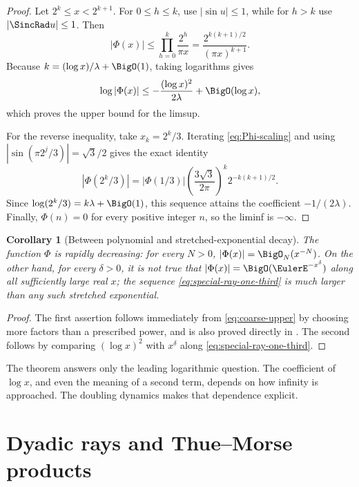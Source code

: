 \documentclass[11pt,oneside]{article}
\newtheorem{corollary}[corollary]{Corollary}
\theoremstyle{definition}
\theoremstyle{remark}
\newcommand{\PhiF}{\Phi}
\begin{document}
\begin{proof}
Let \(2^k\le x<2^{k+1}\).  For \(0\le h\le k\), use
\(|\sin u|\le1\), while for \(h>k\) use \(|\SincRad u|\le1\).  Then
\begin{equation}
 |\PhiF(x)|
 \le \prod_{h=0}^{k}\frac{2^h}{\pi x}
 =\frac{2^{k(k+1)/2}}{(\pi x)^{k+1}}.
 \label{eq:coarse-upper}
\end{equation}
Because \(k=(\log x)/\lambda+\BigO(1)\), taking logarithms gives
\[
 \log|\PhiF(x)|
 \le-\frac{(\log x)^2}{2\lambda}+\BigO(\log x),
\]
which proves the upper bound for the limsup.

For the reverse inequality, take \(x_k=2^k/3\).  Iterating
\eqref{eq:Phi-scaling} and using
\(|\sin(\pi2^j/3)|=\sqrt3/2\) gives the exact identity
\begin{equation}
 |\PhiF(2^k/3)|
 =|\PhiF(1/3)|
 \left(\frac{3\sqrt3}{2\pi}\right)^k
 2^{-k(k+1)/2}.
 \label{eq:special-ray-one-third}
\end{equation}
Since \(\log(2^k/3)=k\lambda+\BigO(1)\), this sequence attains the
coefficient \(-1/(2\lambda)\).  Finally, \(\PhiF(n)=0\) for every positive
integer \(n\), so the liminf is \(-\infty\).
\end{proof}

\begin{corollary}[Between polynomial and stretched-exponential decay]
\label{cor:decay-class}
The function \(\PhiF\) is rapidly decreasing: for every \(N>0\),
\(|\PhiF(x)|=\BigO_N(x^{-N})\).  On the other hand, for every
\(\delta>0\), it is not true that
\(|\PhiF(x)|=\BigO(\EulerE^{-x^\delta})\) along all sufficiently large real
\(x\); the sequence \eqref{eq:special-ray-one-third} is much larger than any
such stretched exponential.
\end{corollary}

\begin{proof}
The first assertion follows immediately from \eqref{eq:coarse-upper} by
choosing more factors than a prescribed power, and is also proved directly in
\cite{arias2017}.  The second follows by comparing
\((\log x)^2\) with \(x^\delta\) along \eqref{eq:special-ray-one-third}.
\end{proof}

The theorem answers only the leading logarithmic question.  The coefficient
of \(\log x\), and even the meaning of a second term, depends on how infinity
is approached.  The doubling dynamics makes that dependence explicit.

\section{Dyadic rays and Thue--Morse products}
\label{sec:rays}
\end{document}
